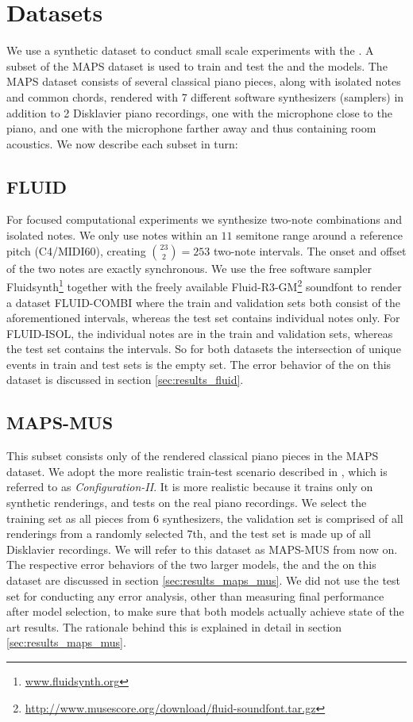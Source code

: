 \section{Datasets}
We use a synthetic dataset to conduct small scale experiments with the \SmallConvNetNPS. A subset of the MAPS dataset \cite{Emiya_Badeau_David_2010} is used to train and test the \ConvNet and the \AUNet models. The MAPS dataset consists of several classical piano pieces, along with isolated notes and common chords, rendered with 7 different software synthesizers (samplers) in addition to 2 Disklavier piano recordings, one with the microphone close to the piano, and one with the microphone farther away and thus containing room acoustics. We now describe each subset in turn:


\subsection{FLUID}
For focused computational experiments we synthesize two-note combinations and isolated notes. We only use notes within an $11$ semitone range around a reference pitch (C4/MIDI60), creating $\binom{23}{2} = 253$ two-note intervals. The onset and offset of the two notes are exactly synchronous. We use the free software sampler Fluidsynth\footnote{\url{www.fluidsynth.org}} together with the freely available Fluid-R3-GM\footnote{\url{http://www.musescore.org/download/fluid-soundfont.tar.gz}} soundfont to render a dataset FLUID-COMBI where the train and validation sets both consist of the aforementioned intervals, whereas the test set contains individual notes only. For FLUID-ISOL, the individual notes are in the train and validation sets, whereas the test set contains the intervals. So for both datasets the intersection of unique events in train and test sets is the empty set. The error behavior of the \SmallConvNet on this dataset is discussed in section \ref{sec:results_fluid}.


\subsection{MAPS-MUS}
This subset consists only of the rendered classical piano pieces in the MAPS dataset. We adopt the more realistic train-test scenario described in \cite{Sigtia_Benetos_Dixon_2016}, which is referred to as \textit{Configuration-II}. It is more realistic because it trains only on synthetic renderings, and tests on the real piano recordings. We select the training set as all pieces from 6 synthesizers, the validation set is comprised of all renderings from a randomly selected 7th, and the test set is made up of all Disklavier recordings. We will refer to this dataset as MAPS-MUS from now on. The respective error behaviors of the two larger models, the \ConvNet and the \AUNet on this dataset are discussed in section \ref{sec:results_maps_mus}. We did not use the test set for conducting any error analysis, other than measuring final performance after model selection, to make sure that both models actually achieve state of the art results. The rationale behind this is explained in detail in section \ref{sec:results_maps_mus}.


